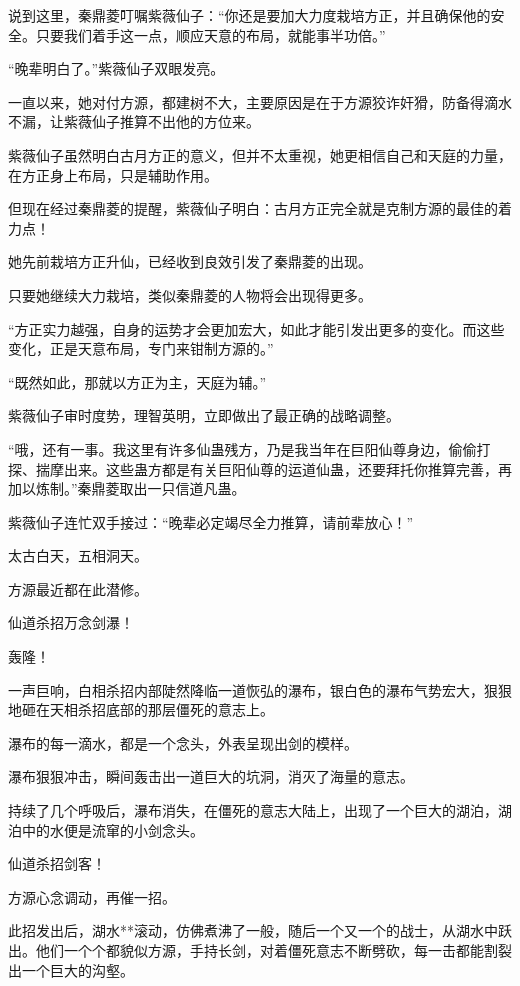 \begin{this_body}
说到这里，秦鼎菱叮嘱紫薇仙子：“你还是要加大力度栽培方正，并且确保他的安全。只要我们着手这一点，顺应天意的布局，就能事半功倍。”

“晚辈明白了。”紫薇仙子双眼发亮。

一直以来，她对付方源，都建树不大，主要原因是在于方源狡诈奸猾，防备得滴水不漏，让紫薇仙子推算不出他的方位来。

紫薇仙子虽然明白古月方正的意义，但并不太重视，她更相信自己和天庭的力量，在方正身上布局，只是辅助作用。

但现在经过秦鼎菱的提醒，紫薇仙子明白：古月方正完全就是克制方源的最佳的着力点！

她先前栽培方正升仙，已经收到良效引发了秦鼎菱的出现。

只要她继续大力栽培，类似秦鼎菱的人物将会出现得更多。

“方正实力越强，自身的运势才会更加宏大，如此才能引发出更多的变化。而这些变化，正是天意布局，专门来钳制方源的。”

“既然如此，那就以方正为主，天庭为辅。”

紫薇仙子审时度势，理智英明，立即做出了最正确的战略调整。

“哦，还有一事。我这里有许多仙蛊残方，乃是我当年在巨阳仙尊身边，偷偷打探、揣摩出来。这些蛊方都是有关巨阳仙尊的运道仙蛊，还要拜托你推算完善，再加以炼制。”秦鼎菱取出一只信道凡蛊。

紫薇仙子连忙双手接过：“晚辈必定竭尽全力推算，请前辈放心！”

太古白天，五相洞天。

方源最近都在此潜修。

仙道杀招万念剑瀑！

轰隆！

一声巨响，白相杀招内部陡然降临一道恢弘的瀑布，银白色的瀑布气势宏大，狠狠地砸在天相杀招底部的那层僵死的意志上。

瀑布的每一滴水，都是一个念头，外表呈现出剑的模样。

瀑布狠狠冲击，瞬间轰击出一道巨大的坑洞，消灭了海量的意志。

持续了几个呼吸后，瀑布消失，在僵死的意志大陆上，出现了一个巨大的湖泊，湖泊中的水便是流窜的小剑念头。

仙道杀招剑客！

方源心念调动，再催一招。

此招发出后，湖水**滚动，仿佛煮沸了一般，随后一个又一个的战士，从湖水中跃出。他们一个个都貌似方源，手持长剑，对着僵死意志不断劈砍，每一击都能割裂出一个巨大的沟壑。


\end{this_body}
